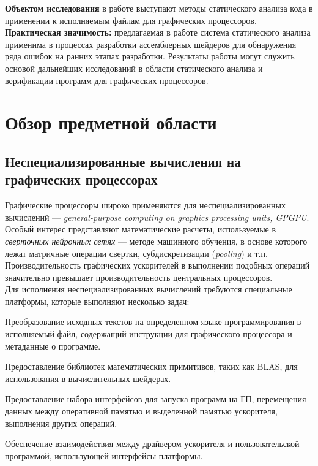 \documentclass[a4paper,14pt]{extarticle}
\begin{document}
\textbf{Объектом исследования} в работе выступают методы статического анализа кода
в применении к исполняемым файлам для графических процессоров.\\

\textbf{Практическая значимость:} предлагаемая в работе система
статического анализа применима в процессах разработки ассемблерных шейдеров
для обнаружения ряда ошибок на ранних этапах разработки. Результаты работы
могут служить основой дальнейших исследований в области статического анализа
и верификации программ для графических процессоров.

\newpage
\section{Обзор предметной области}

\subsection{Неспециализированные вычисления на графических процессорах}

Графические процессоры широко применяются для неспециализированных вычислений —
\textit{general-purpose computing on graphics processing units, GPGPU}.
Особый интерес представляют математические расчеты, используемые в
\textit{сверточных нейронных сетях} — методе машинного обучения, в основе которого
лежат матричные операции свертки, субдискретизации (\textit{pooling}) и т.п.
Производительность графических ускорителей в выполнении подобных операций
значительно превышает производительность центральных процессоров.\\

Для исполнения неспециализированных вычислений требуются специальные платформы,
которые выполняют несколько задач:
\begin{ul}
\item Преобразование исходных текстов на определенном языке программирования
  в исполняемый файл, содержащий инструкции для графического процессора и метаданные о программе.
\item Предоставление библиотек математических примитивов, таких как BLAS,
  для использования в вычислительных шейдерах.
\item Предоставление набора интерфейсов для запуска программ на ГП, перемещения данных между
  оперативной памятью и выделенной памятью ускорителя, выполнения других операций.
\item Обеспечение взаимодействия между драйвером ускорителя и пользовательской программой,
  использующей интерфейсы платформы.
\end{ul}\ %
\end{document}
